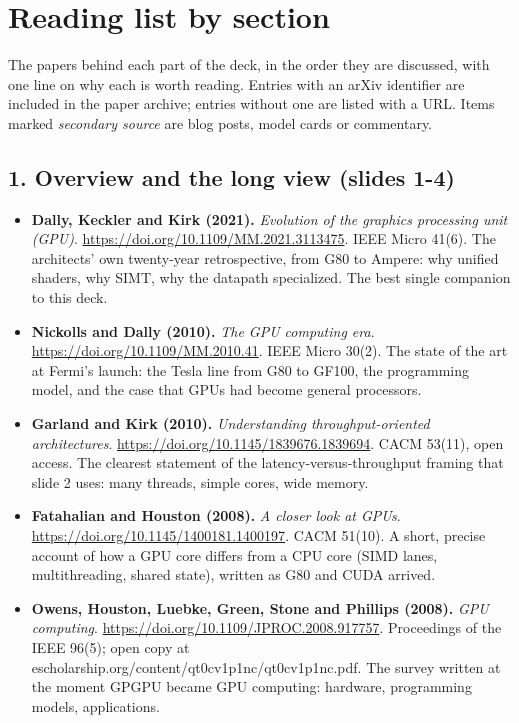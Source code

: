 \section*{Reading list by section}
The papers behind each part of the deck, in the order they are discussed, with one line on why each is worth reading. Entries with an arXiv identifier are included in the paper archive; entries without one are listed with a URL. Items marked \emph{secondary source} are blog posts, model cards or commentary.

\subsection*{1. Overview and the long view (slides 1-4)}
\begin{itemize}[leftmargin=1.2em,itemsep=3pt]\sloppy
\item \textbf{Dally, Keckler and Kirk (2021).} \textit{Evolution of the graphics processing unit (GPU)}. \url{https://doi.org/10.1109/MM.2021.3113475}. IEEE Micro 41(6). The architects' own twenty-year retrospective, from G80 to Ampere: why unified shaders, why SIMT, why the datapath specialized. The best single companion to this deck.
\item \textbf{Nickolls and Dally (2010).} \textit{The GPU computing era}. \url{https://doi.org/10.1109/MM.2010.41}. IEEE Micro 30(2). The state of the art at Fermi's launch: the Tesla line from G80 to GF100, the programming model, and the case that GPUs had become general processors.
\item \textbf{Garland and Kirk (2010).} \textit{Understanding throughput-oriented architectures}. \url{https://doi.org/10.1145/1839676.1839694}. CACM 53(11), open access. The clearest statement of the latency-versus-throughput framing that slide 2 uses: many threads, simple cores, wide memory.
\item \textbf{Fatahalian and Houston (2008).} \textit{A closer look at GPUs}. \url{https://doi.org/10.1145/1400181.1400197}. CACM 51(10). A short, precise account of how a GPU core differs from a CPU core (SIMD lanes, multithreading, shared state), written as G80 and CUDA arrived.
\item \textbf{Owens, Houston, Luebke, Green, Stone and Phillips (2008).} \textit{GPU computing}. \url{https://doi.org/10.1109/JPROC.2008.917757}. Proceedings of the IEEE 96(5); open copy at escholarship.org/content/qt0cv1p1nc/qt0cv1p1nc.pdf. The survey written at the moment GPGPU became GPU computing: hardware, programming models, applications.

\end{itemize}
